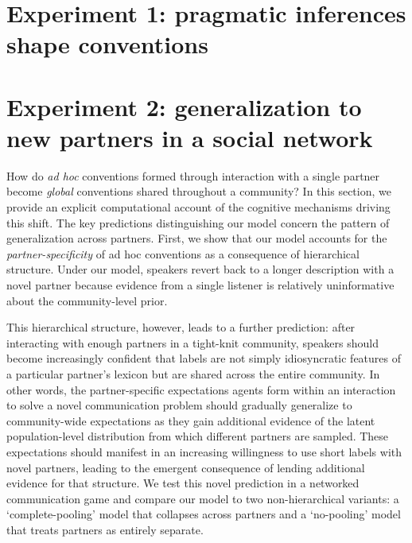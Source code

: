 \documentclass[11pt, floatsintext]{apa6}
\begin{document}
\section{Experiment 1: pragmatic inferences shape conventions}
%
%
%
%
%
%
\section{Experiment 2: generalization to new partners in a social network}

How do \emph{ad hoc} conventions formed through interaction with a single partner become \emph{global} conventions shared throughout a community?
In this section, we provide an explicit computational account of the cognitive mechanisms driving this shift.
The key predictions distinguishing our model concern the pattern of generalization across partners.
First, we show that our model accounts for the \emph{partner-specificity} of ad hoc conventions as a consequence of hierarchical structure. 
Under our model, speakers revert back to a longer description with a novel partner because evidence from a single listener is relatively uninformative about the community-level prior.

This hierarchical structure, however, leads to a further prediction: after interacting with enough partners in a tight-knit community, speakers should become increasingly confident that labels are not simply idiosyncratic features of a particular partner's lexicon but are shared across the entire community.
In other words, the partner-specific expectations agents form within an interaction to solve a novel communication problem should gradually generalize to community-wide expectations as they gain additional evidence of the latent population-level distribution from which different partners are sampled.
These expectations should manifest in an increasing willingness to use short labels with novel partners, leading to the emergent consequence of lending additional evidence for that structure. 
We test this novel prediction in a networked communication game and compare our model to two non-hierarchical variants: a `complete-pooling' model that collapses across partners and a `no-pooling' model that treats partners as entirely separate.
\end{document}
